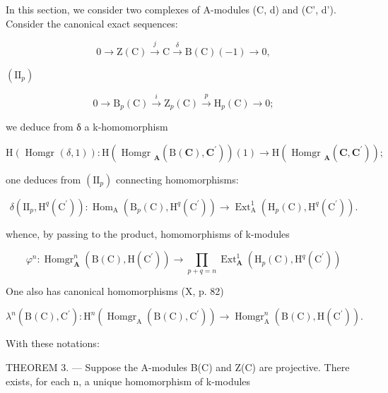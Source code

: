 In this section, we consider two complexes of A-modules (C, d) and (C', d'). Consider the canonical exact sequences:

\[
0 \rightarrow \mathrm{Z} (\mathrm{C}) \stackrel {{j}} {{\rightarrow}} \mathrm{C} \stackrel {{\delta}} {{\rightarrow}} \mathrm{B} (\mathrm{C}) (- 1) \rightarrow 0,\tag{I}
\]

\((\mathrm{II}_{p})\)

\[
0 \to \mathrm{B} _ {p} (\mathrm{C}) \stackrel {{i}} {{\to}} \mathrm{Z} _ {p} (\mathrm{C}) \stackrel {{p}} {{\to}} \mathrm{H} _ {p} (\mathrm{C}) \to 0;
\]

we deduce from δ a k-homomorphism

\[
\mathrm{H} (\text { Homgr } (\delta , 1)): \mathrm{H} (\text { Homgr } _ {\mathbf {A}} (\mathrm{B} (\mathbf {C}), \mathbf {C} ^ {\prime})) (1) \rightarrow \mathrm{H} (\text { Homgr } _ {\mathbf {A}} (\mathbf {C}, \mathbf {C} ^ {\prime}));
\]

one deduces from \((\mathrm{II}_{p})\) connecting homomorphisms:

\[
\delta \left(\mathrm{II} _ {p}, \mathrm{H} ^ {q} \left(\mathrm{C} ^ {\prime}\right)\right): \operatorname{Hom} _ {\mathrm{A}} \left(\mathrm{B} _ {p} (\mathrm{C}), \mathrm{H} ^ {q} \left(\mathrm{C} ^ {\prime}\right)\right)\rightarrow \operatorname{Ext} _ {\mathrm{A}} ^ {1} \left(\mathrm{H} _ {p} (\mathrm{C}), \mathrm{H} ^ {q} \left(\mathrm{C} ^ {\prime}\right)\right).
\]

whence, by passing to the product, homomorphisms of k-modules

\[
\varphi^ {n}: \operatorname{Homgr} _ {\mathbf {A}} ^ {n} (\mathrm{B} (\mathrm{C}), \mathrm{H} (\mathrm{C} ^ {\prime})) \rightarrow \prod_ {p + q = n} \operatorname{Ext} _ {\mathbf {A}} ^ {1} \left(\mathrm{H} _ {p} (\mathrm{C}), \mathrm{H} ^ {q} (\mathrm{C} ^ {\prime})\right)
\]

One also has canonical homomorphisms (X, p. 82)

\[
\lambda^ {n} (\mathrm{B} (\mathrm{C}), \mathrm{C} ^ {\prime}): \mathrm{H} ^ {n} \left(\operatorname{Homgr} _ {\mathrm{A}} (\mathrm{B} (\mathrm{C}), \mathrm{C} ^ {\prime})\right)\rightarrow \operatorname{Homgr} _ {\mathrm{A}} ^ {n} (\mathrm{B} (\mathrm{C}), \mathrm{H} (\mathrm{C} ^ {\prime})) .
\]

With these notations:

THEOREM 3. --- Suppose the A-modules B(C) and Z(C) are projective. There exists, for each n, a unique homomorphism of k-modules

